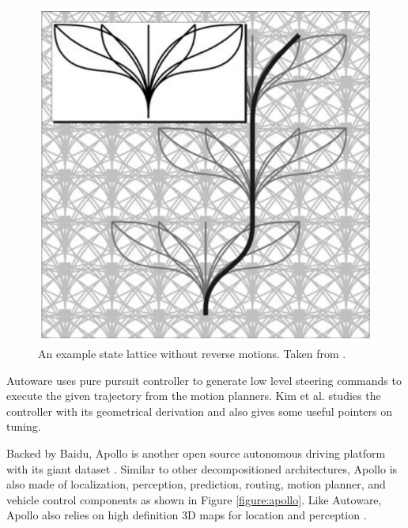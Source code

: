 \begin{figure}[h]
  \centering
  \includegraphics[width=.8\textwidth]{figures/state-lattice.png}
  \caption{An example state lattice without reverse motions. Taken from
    \cite{Pivtoraiko2009DifferentiallyCM}.}
  \label{figure:state-lattice}
\end{figure}

Autoware uses pure pursuit controller to generate low level steering commands
to execute the given trajectory from the motion planners. Kim et al.
\cite{Kim2013SensorbasedMP} studies the controller with its geometrical
derivation and also gives some useful pointers on tuning.

Backed by Baidu, Apollo is another open source autonomous driving platform with
its giant dataset \cite{Huang2018TheAD}. Similar to other decompositioned
architectures, Apollo is also made of localization, perception, prediction,
routing, motion planner, and vehicle control components as shown in Figure
\ref{figure:apollo}. Like Autoware, Apollo also relies on high definition 3D
maps for location and perception \cite{Fan2018BaiduAE}.

